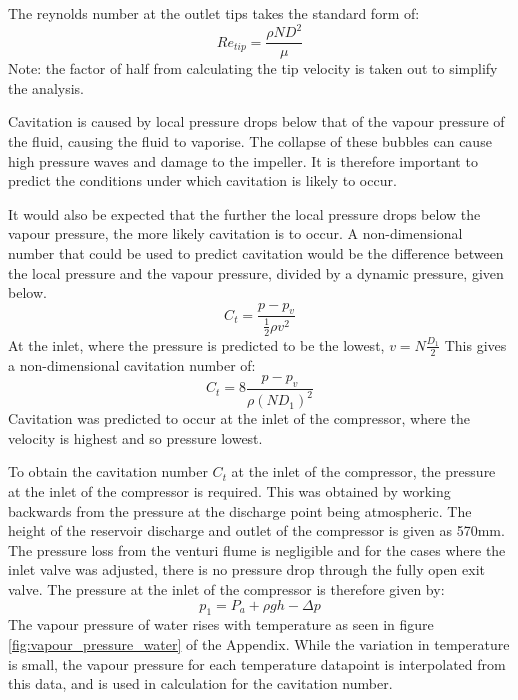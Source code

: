 \documentclass{article}
\begin{document}
The reynolds number at the outlet tips takes the standard form of:
\begin{equation}
    Re_{tip} = \frac{\rho ND^2}{\mu}
\end{equation}
Note: the factor of half from calculating the tip velocity is taken out to simplify the analysis.

Cavitation is caused by local pressure drops below that of the vapour pressure of the fluid, causing the fluid to vaporise.
The collapse of these bubbles can cause high pressure waves and damage to the impeller.
It is therefore important to predict the conditions under which cavitation is likely to occur.

It would also be expected that the further the local pressure drops below the vapour pressure, the more likely cavitation is to occur.
A non-dimensional number that could be used to predict cavitation would be the difference between the local pressure and the vapour pressure, divided by a dynamic pressure, given below.
\begin{equation}
    C_t = \frac{p - p_v}{\frac{1}{2}\rho v^2}
\end{equation}
At the inlet, where the pressure is predicted to be the lowest, $v = N \frac{D_1}{2}$
This gives a non-dimensional cavitation number of:
\begin{equation}
    C_t = 8\frac{p - p_v}{\rho (ND_1)^2}
\end{equation}
Cavitation was predicted to occur at the inlet of the compressor, where the velocity is highest and so pressure lowest.

To obtain the cavitation number $C_t$ at the inlet of the compressor, the pressure at the inlet of the compressor is required.
This was obtained by working backwards from the pressure at the discharge point being atmospheric.
The height of the reservoir discharge and outlet of the compressor is given as 570mm. The pressure loss from the
venturi flume is negligible and for the cases where the inlet valve was adjusted, there is no pressure drop through the fully open exit valve.
The pressure at the inlet of the compressor is therefore given by:
\begin{equation}
    p_1 =  P_a + \rho g h - \Delta p
\end{equation}
The vapour pressure of water rises with temperature as seen in figure \ref{fig:vapour_pressure_water} of the Appendix.
While the variation in temperature is small, the vapour pressure for each temperature datapoint is interpolated from this data, and is used in calculation for the cavitation number.
\end{document}
